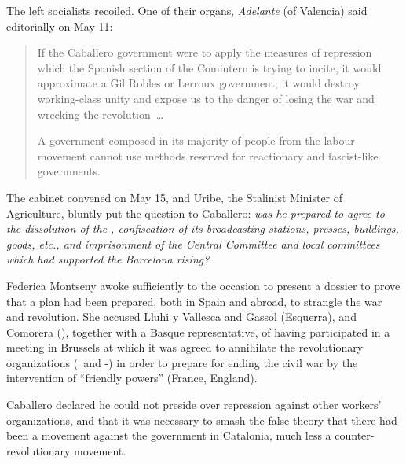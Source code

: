 The left socialists recoiled. One of their organs, \emph{Adelante} (of Valencia) said editorially on May 11:

\begin{quotation}
  If the Caballero government were to apply the measures of repression which the Spanish section of the Comintern is trying to incite, it would approximate a Gil Robles or Lerroux government; it would destroy working-class unity and expose us to the danger of losing the war and wrecking the revolution~\dots
  
  A government composed in its majority of people from the labour movement cannot use methods reserved for reactionary and fascist-like governments.
\end{quotation}

The cabinet convened on May 15, and Uribe, the Stalinist Minister of Agriculture, bluntly put the question to Caballero: \emph{was he prepared to agree to the dissolution of the \POUM, confiscation of its broadcasting stations, presses, buildings, goods, etc., and imprisonment of the Central Committee and local committees which had supported the Barcelona rising?}

Federica Montseny awoke sufficiently to the occasion to present a dossier to prove that a plan had been prepared, both in Spain and abroad, to strangle the war and revolution. She accused Lluhi y Vallesca and Gassol (Esquerra), and Comorera (\PSUC), together with a Basque representative, of having participated in a meeting in Brussels at which it was agreed to annihilate the revolutionary organizations (\POUM\ and \CNT-\FAI) in order to prepare for ending the civil war by the intervention of ``friendly powers'' (France, England).

Caballero declared he could not preside over repression against other workers’ organizations, and that it was necessary to smash the false theory that there had been a movement against the government in Catalonia, much less a counter-revolutionary movement.

